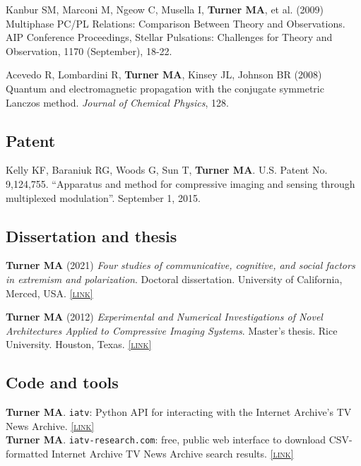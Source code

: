 \documentclass[11pt, letterpaper]{article}
\newcommand{\lurl}[1]{\href{#1}{\scriptsize\textsc{[link]}}}
\begin{document}
    Kanbur SM, Marconi M, Ngeow C, Musella I, \textbf{Turner MA}, et al. (2009) Multiphase PC/PL Relations: Comparison Between Theory and Observations. AIP Conference Proceedings, Stellar Pulsations: Challenges for Theory and Observation, 1170 (September), 18-22.

    Acevedo R, Lombardini R, \textbf{Turner MA}, Kinsey JL, Johnson BR (2008)
    Quantum and electromagnetic propagation with the conjugate symmetric
    Lanczos method. \emph{Journal of Chemical Physics}, 128.

    \subsection{Patent}

  Kelly KF, Baraniuk RG, Woods G, Sun T, \textbf{Turner MA}. U.S. Patent No. 9,124,755. 
  ``Apparatus and method for compressive imaging and sensing through multiplexed modulation''.
  September 1, 2015.

  \subsection{Dissertation and thesis}

  \textbf{Turner MA} (2021) \emph{Four studies of communicative, cognitive,
  and social factors in extremism and polarization}. Doctoral dissertation.
  University of California, Merced, USA. \lurl{https://escholarship.org/uc/item/56h2v4bg}

  \textbf{Turner MA} (2012) \emph{Experimental and Numerical
  Investigations of Novel Architectures Applied to Compressive
Imaging Systems}. Master's thesis. Rice University. Houston,
Texas. \lurl{https://www.researchgate.net/publication/274720620_Experimental_and_Numerical_In vestigations_of_Novel_Architectures_Applied_to_Compressive_Imaging_Systems}

\subsection{Code and tools}

\textbf{Turner MA}. \texttt{iatv}: Python API for interacting with the Internet
Archive's TV News Archive. \lurl{https://github.com/mt-digital/iatv} \\

\textbf{Turner MA}. \texttt{iatv-research.com}: free, public web interface to download
CSV-formatted Internet Archive TV News Archive search results. \lurl{http://iatv-research.com}
\end{document}
